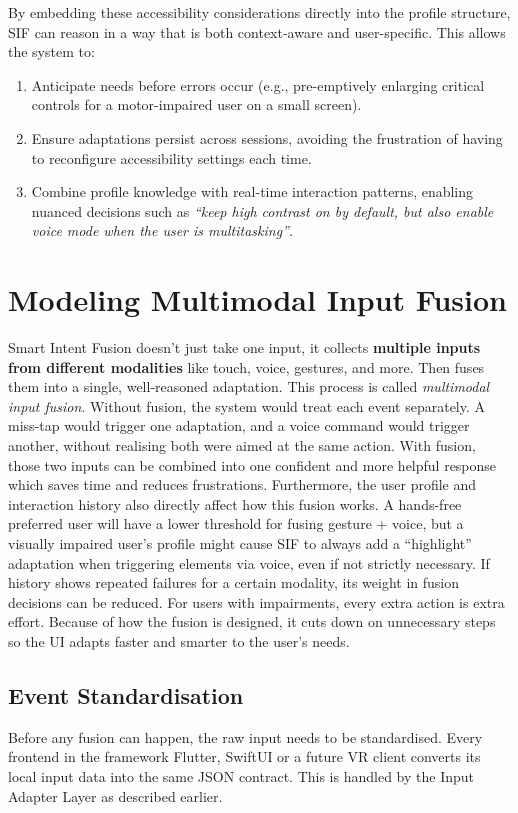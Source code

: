 By embedding these accessibility considerations directly into the profile structure, SIF can reason in a way that is both context-aware and user-specific. This allows the system to:
\begin{enumerate}
    \item Anticipate needs before errors occur (e.g., pre-emptively enlarging critical controls for a motor-impaired user on a small screen).
    \item Ensure adaptations persist across sessions, avoiding the frustration of having to reconfigure accessibility settings each time.
    \item Combine profile knowledge with real-time interaction patterns, enabling nuanced decisions such as \emph{“keep high contrast on by default, but also enable voice mode when the user is multitasking”}.
\end{enumerate}

\section{Modeling Multimodal Input Fusion}
Smart Intent Fusion doesn’t just take one input, it collects \textbf{multiple inputs from different modalities} like touch, voice, gestures, and more. Then fuses them into a single, well-reasoned adaptation. This process is called \textit{multimodal input fusion}.
Without fusion, the system would treat each event separately. A miss-tap would trigger one adaptation, and a voice command would trigger another, without realising both were aimed at the same action. With fusion, those two inputs can be combined into one confident and more helpful response which saves time and reduces frustrations. Furthermore, the user profile and interaction history also directly affect how this fusion works. A hands-free preferred user will have a lower threshold for fusing gesture + voice, but a visually impaired user’s profile might cause SIF to always add a “highlight” adaptation when triggering elements via voice, even if not strictly necessary. If history shows repeated failures for a certain modality, its weight in fusion decisions can be reduced. For users with impairments, every extra action is extra effort. Because of how the fusion is designed, it cuts down on unnecessary steps so the UI adapts faster and smarter to the user’s needs.

\subsection{Event Standardisation}
Before any fusion can happen, the raw input needs to be standardised.
Every frontend in the framework Flutter, SwiftUI or a future VR client converts its local input data into the same JSON contract. This is handled by the Input Adapter Layer as described earlier.

